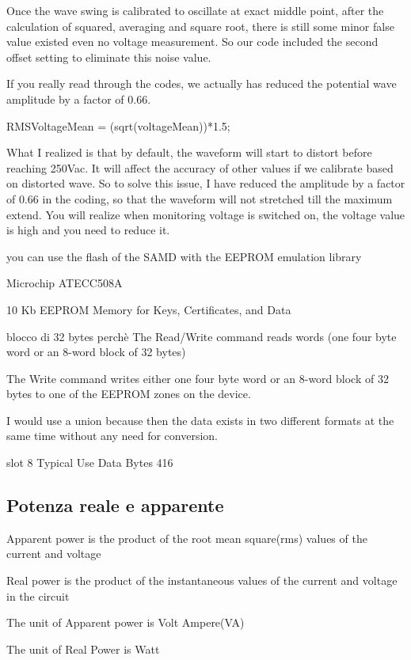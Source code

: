 \documentclass[italian,12pt,a4paper,oneside,final]{report}
\begin{document}
Once the wave swing is calibrated to oscillate at exact middle point, after the calculation of squared, averaging and square root, there is still some minor false value existed even no voltage measurement. So our code included the second offset setting to eliminate this noise value. 



If you really read through the codes, we actually has reduced the potential wave amplitude by a factor of 0.66. 

RMSVoltageMean = (sqrt(voltageMean))*1.5;

What I realized is that by default, the waveform will start to distort before reaching 250Vac. It will affect the accuracy of other values if we calibrate based on distorted wave. So to solve this issue, I have reduced the amplitude by a factor of 0.66 in the coding, so that the waveform will not stretched till the maximum extend. You will realize when monitoring voltage is switched on, the voltage value is high and you need to reduce it. 



you can use the flash of the SAMD with the EEPROM emulation library

Microchip ATECC508A

10 Kb EEPROM Memory for Keys, Certificates, and Data


blocco di 32 bytes perchè The Read/Write command reads words (one four byte word or an 8-word block of 32 bytes)

The Write command writes either one four byte word or an 8-word block of 32 bytes to one of the
EEPROM zones on the device.

I would use a union because then the data exists in two different formats at the same time without any need for conversion.

slot 8 Typical Use Data Bytes 416


\subsection{Potenza reale e apparente}
Apparent power is the product of the root mean square(rms) values of the current and voltage

Real power is the product of the instantaneous values of the current and voltage in the circuit

The unit of Apparent power is Volt Ampere(VA)


The unit of Real Power is Watt
\end{document}
